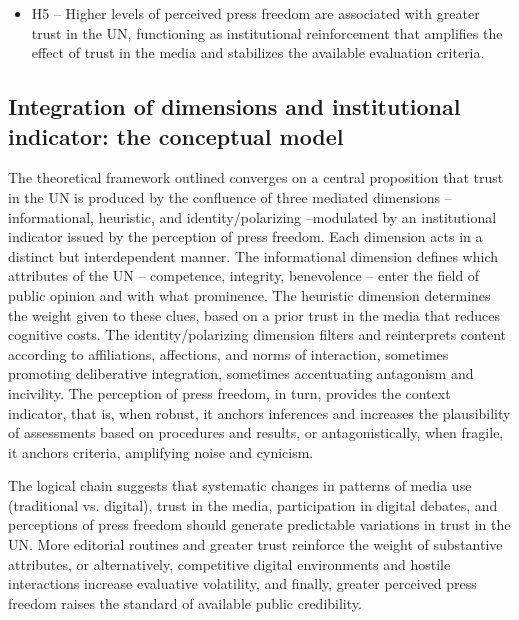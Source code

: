 \documentclass[english]{textolivre}
\begin{document}
\begin{itemize}
    \item H5 -- Higher levels of perceived press freedom are associated with greater trust in the UN, functioning as institutional reinforcement that amplifies the effect of trust in the media and stabilizes the available evaluation criteria.
\end{itemize}


\subsection{Integration of dimensions and institutional indicator: the conceptual model}
The theoretical framework outlined converges on a central proposition that trust in the UN is produced by the confluence of three mediated dimensions --informational, heuristic, and identity/polarizing --modulated by an institutional indicator issued by the perception of press freedom. Each dimension acts in a distinct but interdependent manner. The informational dimension defines which attributes of the UN -- competence, integrity, benevolence -- enter the field of public opinion and with what prominence. The heuristic dimension determines the weight given to these clues, based on a prior trust in the media that reduces cognitive costs. The identity/polarizing dimension filters and reinterprets content according to affiliations, affections, and norms of interaction, sometimes promoting deliberative integration, sometimes accentuating antagonism and incivility. The perception of press freedom, in turn, provides the context indicator, that is, when robust, it anchors inferences and increases the plausibility of assessments based on procedures and results, or antagonistically, when fragile, it anchors criteria, amplifying noise and cynicism.

The logical chain suggests that systematic changes in patterns of media use (traditional vs. digital), trust in the media, participation in digital debates, and perceptions of press freedom should generate predictable variations in trust in the UN. More editorial routines and greater trust reinforce the weight of substantive attributes, or alternatively, competitive digital environments and hostile interactions increase evaluative volatility, and finally, greater perceived press freedom raises the standard of available public credibility.
\end{document}
